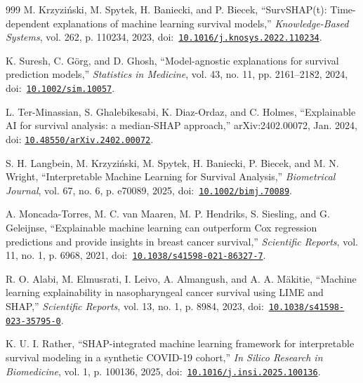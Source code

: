 \begin{thebibliography}{999}
\def\currentbiburl{https://doi.org/10.1016/j.knosys.2022.110234}
 M. Krzyziński, M. Spytek, H. Baniecki, and P. Biecek, ``SurvSHAP(t): Time-dependent explanations of machine learning survival models,'' \emph{Knowledge-Based Systems}, vol. 262, p. 110234, 2023, doi:~\href{https://doi.org/10.1016/j.knosys.2022.110234}{\nolinkurl{10.1016/j.knosys.2022.110234}}.

\def\currentbiburl{https://doi.org/10.1002/sim.10057}
 K. Suresh, C. Görg, and D. Ghosh, ``Model-agnostic explanations for survival prediction models,'' \emph{Statistics in Medicine}, vol. 43, no. 11, pp. 2161--2182, 2024, doi:~\href{https://doi.org/10.1002/sim.10057}{\nolinkurl{10.1002/sim.10057}}.

\def\currentbiburl{https://doi.org/10.48550/arXiv.2402.00072}
 L. Ter-Minassian, S. Ghalebikesabi, K. Diaz-Ordaz, and C. Holmes, ``Explainable AI for survival analysis: a median-SHAP approach,'' arXiv:2402.00072, Jan. 2024, doi: \href{https://doi.org/10.48550/arXiv.2402.00072}{\nolinkurl{10.48550/arXiv.2402.00072}}.

\def\currentbiburl{https://doi.org/10.1002/bimj.70089}
 S. H. Langbein, M. Krzyziński, M. Spytek, H. Baniecki, P. Biecek, and M. N. Wright, ``Interpretable Machine Learning for Survival Analysis,'' \emph{Biometrical Journal}, vol. 67, no. 6, p. e70089, 2025, doi:~\href{https://doi.org/10.1002/bimj.70089}{\nolinkurl{10.1002/bimj.70089}}.

\def\currentbiburl{https://doi.org/10.1038/s41598-021-86327-7}
 A. Moncada-Torres, M. C. van Maaren, M. P. Hendriks, S. Siesling, and G. Geleijnse, ``Explainable machine learning can outperform Cox regression predictions and provide insights in breast cancer survival,'' \emph{Scientific Reports}, vol. 11, no. 1, p. 6968, 2021, doi:~\href{https://doi.org/10.1038/s41598-021-86327-7}{\nolinkurl{10.1038/s41598-021-86327-7}}.

\def\currentbiburl{https://doi.org/10.1038/s41598-023-35795-0}
 R. O. Alabi, M. Elmusrati, I. Leivo, A. Almangush, and A. A. Mäkitie, ``Machine learning explainability in nasopharyngeal cancer survival using LIME and SHAP,'' \emph{Scientific Reports}, vol. 13, no. 1, p. 8984, 2023, doi:~\href{https://doi.org/10.1038/s41598-023-35795-0}{\nolinkurl{10.1038/s41598-023-35795-0}}.

\def\currentbiburl{https://doi.org/10.1016/j.insi.2025.100136}
 K. U. I. Rather, ``SHAP-integrated machine learning framework for interpretable survival modeling in a synthetic COVID-19 cohort,'' \emph{In Silico Research in Biomedicine}, vol. 1, p. 100136, 2025, doi:~\href{https://doi.org/10.1016/j.insi.2025.100136}{\nolinkurl{10.1016/j.insi.2025.100136}}.


\end{thebibliography}
